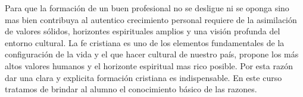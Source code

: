 \begin{syllabus}


\begin{justification}
Para que la formación de un buen profesional no se desligue ni se oponga sino mas bien contribuya al autentico crecimiento personal requiere de la asimilación de valores sólidos, horizontes espirituales amplios y una visión profunda del entorno cultural. La fe cristiana es uno de los elementos fundamentales de la configuración de la vida y el que hacer cultural de nuestro país, propone los más altos valores humanos y el horizonte espiritual mas rico posible.
Por esta razón dar una clara y explicita formación cristiana es indispensable.  En este curso tratamos de brindar al alumno el conocimiento básico de las razones.
\end{justification}

\begin{goals}
\item \OutcomeFH
\end{goals}

\begin{outcomes}
\end{outcomes}


\end{syllabus}
